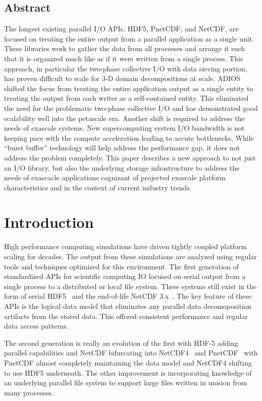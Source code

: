 \documentclass[letterpaper,twocolumn,10pt]{article}
\begin{document}
\subsection*{Abstract}
The longest existing parallel I/O APIs, HDF5, PnetCDF, and NetCDF, are focused
on treating the entire output from a parallel application as a single unit.
These libraries work to gather the data from all processes and arrange it such
that it is organized much like as if it were written from a single process.
This approach, in particular the two-phase collective I/O with data sieving
portion, has proven difficult to scale for 3-D domain decompositions at scale.
ADIOS shifted the focus from treating the entire application output as a single
entity to treating the output from each writer as a self-contained entity. This
eliminated the need for the problematic two-phase collective I/O and has
demonstrated good scalability well into the petascale era. Another shift is
required to address the needs of exascale systems. New supercomputing system
I/O bandwidth is not keeping pace with the compute acceleration leading to
accute bottlenecks.  While ``burst buffer'' technology will help address the
performance gap, it does not address the problem completely. This paper
describes a new approach to not just an I/O library, but also the underlying
storage infrastructure to address the needs of exascacle applications cognizant
of projected exascale platform characteristics and in the context of current
industry trends.

\section{Introduction}

High performance computing simulations have driven tightly coupled platform
scaling for decades. The output from these simulations are analyzed using
regular tools and techniques optimized for this environment.  The first
generation of standardized APIs for scientific computing IO focused on serial
output from a single process to a distributed or local file system.  These
systems still exist in the form of serial
HDF5~\cite{chilan:2006:hdf5-performance} and the end-of-life NetCDF
3.x~\cite{netcdf3}. The key feature of these APIs is the logical data model
that eliminates any parallel data decomoposition artifacts from the stored
data.  This offered consistent performance and regular data access patterns.

The second generation is really an evolution of the first with HDF-5 adding
parallel capabilities and NetCDF bifurcating into
NetCDF4~\cite{rew:2011:netcdf-guide} and PnetCDF~\cite{torrellas:2003:pnetcdf}
with PnetCDF almost completely maintaining the data model and NetCDF4 shifting
to use HDF5 underneath. The other improvement is incorporating knowledge of an
underlying parallel file system to support large files written in unision from
many processes.
\end{document}

